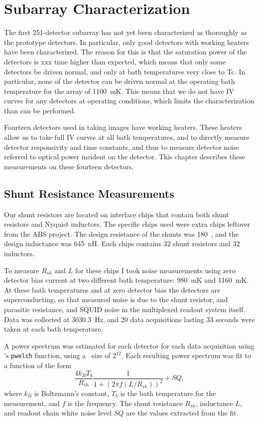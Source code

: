 \chapter{Subarray Characterization}\label{c:det-array}

The first 251-detector subarray has not yet been characterized as thoroughly as the prototype detectors.
In particular, only good detectors with working heaters have been characterized.
The reason for this is that the saturation power of the detectors is xxx time higher than expected, which means that only some detectors be driven normal, and only at bath temperatures very close to Tc.
In particular, none of the detector can be driven normal at the operating bath temperature for the array of 1100~mK.
This means that we do not have IV curves for any detectors at operating conditions, which limits the characterization than can be performed.

Fourteen detectors used in taking images have working heaters.
These heaters allow us to take full IV curves at all bath temperatures, and to directly measure detector responsivity and time constants, and thus to measure detector noise referred to optical power incident on the detector.
This chapter describes these measurements on these fourteen detectors.

\section{Shunt Resistance Measurements}

Our shunt resistors are located on interface chips that contain both shunt resistors and Nyquist inductors.
The specific chips used were extra chips leftover from the ABS\cite{xxx} project.
The design resistance of the shunts was 180~\uOhm, and the design inductance was 645~nH\cite{xxxSuzanne personal communication}.
Each chips contains 32 shunt resistors and 32 inductors.

To measure $R_{sh}$ and $L$ for these chips I took noise measurements using zero detector bias current at two different bath temperature: 980~mK and 1160~mK.
At these bath temperatures and at zero detector bias the detectors are superconducting, so that measured noise is due to the shunt resistor, and parasitic resistance, and SQUID noise in the multiplexed readout system itself.
Data was collected at 3030.3~Hz, and 20 data acquisitions lasting 33 seconds were taken at each bath temperature.

A power spectrum was estimated for each detector for each data acquisition using \MATLAB's \texttt{pwelch} function, using a \FFT\ size of $2^12$.
Each resulting power spectrum was fit to a function of the form
\[
	\frac{4 k_B T_b}{R_{sh}} \frac{1}{1 + (2 \pi f (L/R_{sh}))^2} + SQ,
\]
where $k_B$ is Boltzmann's constant, $T_b$ is the bath temperature for the measurement, and $f$ is the frequency.
The shunt resistance $R_{sh}$, inductance $L$, and readout chain white noise level $SQ$ are the values extracted from the fit.

